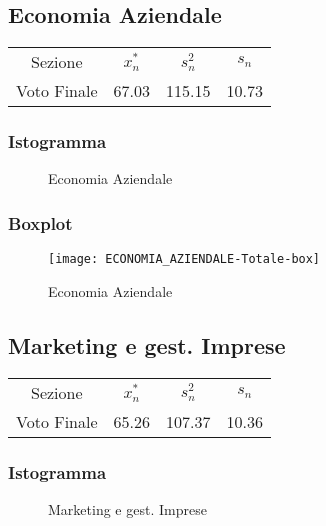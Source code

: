 \thispagestyle{empty} %
\subsection{Economia Aziendale}

\begin{center}
\begin{tabular}{cccc}
  \toprule
  Sezione & \(x_{n}^{*}\) & \(s_n^2\) & \(s_n\) \\
  Voto Finale & 67.03 & 115.15 & 10.73 \\
  \bottomrule
\end{tabular}
\end{center}

\subsubsection{Istogramma}
\begin{figure}[!h]
  \caption{Economia Aziendale}
\end{figure}

\subsubsection{Boxplot}
\begin{figure}[!h]
  \centering
  \texttt{[image: ECONOMIA\_AZIENDALE-Totale-box]}
  \caption{Economia Aziendale}
\end{figure}
\restoregeometry
\clearpage

\thispagestyle{empty} %
\subsection{Marketing e gest. Imprese}

\begin{center}
\begin{tabular}{cccc}
  \toprule
  Sezione & \(x_{n}^{*}\) & \(s_n^2\) & \(s_n\) \\
  Voto Finale & 65.26 & 107.37 & 10.36 \\
  \bottomrule
\end{tabular}
\end{center}

\subsubsection{Istogramma}
\begin{figure}[!h]
  \caption{Marketing e gest. Imprese}
\end{figure}

